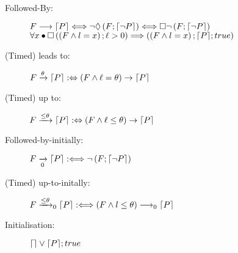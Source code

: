 \begin{tcolorbox}[colback=kapiteleins!5!white, colframe=yellow!75!black, title=\textbf{DC Standard Forms}, left=0mm, right=0mm, top=0mm, bottom=0mm]
\begin{description}
\item[Followed-By:] $F \longrightarrow \lceil P \rceil \Longleftrightarrow \lnot \Diamond \left( F ; \lceil \lnot P \rceil \right) \Longleftrightarrow \Box \lnot \left( F; \lceil \lnot P \rceil \right)$\\
$\forall x \bullet \Box \left(\left ( F \land l = x \right) ; \ell > 0 \right) \Longrightarrow \left(\left( F \land l = x \right) ; \lceil P \rceil ; true \right)$\\
\begin{center}
\end{center}
\item[(Timed) leads to:] $ F \xrightarrow{\theta} \lceil P \rceil : \Leftrightarrow \left(F \land \ell = \theta\right) \rightarrow \lceil P \rceil$
\begin{center}
\end{center}
\item[(Timed) up to:] $F \xrightarrow{\leq \theta} \lceil P \rceil : \Leftrightarrow \left(F \land \ell \leq \theta\right) \rightarrow \lceil P \rceil$
\begin{center}
\end{center}
\item[Followed-by-initially:] $F \xrightarrow[0]{} \lceil P \rceil : \Longleftrightarrow \lnot \left(F ; \lceil \lnot P \rceil\right)$
\begin{center}
\end{center}
\item[(Timed) up-to-initally:] $F \xrightarrow{\leq \theta}_0 \lceil P \rceil : \Longleftrightarrow \left(F \land l \leq \theta \right) \longrightarrow_0 \lceil P \rceil$
\begin{center}
\end{center}
\item[Initialisation:] $\lceil  \rceil \lor \lceil P \rceil ; true$
\begin{center}
\end{center}
\end{description}
\end{tcolorbox}

